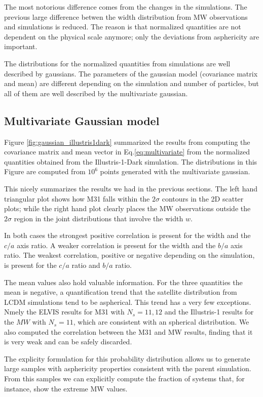 \documentclass[a4paper,fleqn,usenatbib]{mnras}
\begin{document}
The most notorious difference comes from the changes in the
simulations. 
The previous large difference betwen the width distribution from
MW observations and simulations is reduced. 
The reason is that normalized quantities are not dependent on the
physical scale anymore; only the deviations from asphericity are
important.

The distributions for the normalized quantities from simulations are
well described by gaussians. 
The parameters of the gaussian model (covariance matrix and mean)
are different depending on the simulation and number of particles, but
all of them are well described by the multivariate gaussian.

\subsection{Multivariate Gaussian model}

Figure \ref{fig:gaussian_illustris1dark} summarized the results from
 computing the covariance matrix and mean vector in
 Eq.\ref{eq:multivariate} from the normalized quantities obtained from
 the Illustris-1-Dark simulation.
The distributions in this Figure are computed from $10^6$ points
generated with the multivariate gaussian. 

This nicely summarizes the results we had in the previous
sections. 
The left hand triangular plot shows how M31 falls within the $2\sigma$
contours in the 2D scatter plots;
while the right hand plot clearly places the MW observations outside
the $2\sigma$ region in the joint distributions that involve the width
$w$.   

In both cases the strongest positive correlation is present for the
width and the $c/a$ axis ratio. 
A weaker correlation is present for the width and the $b/a$ axis
ratio.  
The weakest correlation, positive or negative depending on the
simulation, is present for the $c/a$ ratio and $b/a$ ratio.

The mean values also hold valuable information. 
For the three quantities the mean is negative, a quantification trend
that the satellite distribution from LCDM simulations tend to be aspherical.
This trend has a very few exceptions. 
Nmely the ELVIS results for M31 with $N_s=11,12$ and the Illustris-1
results for the $MW$ with $N_s=11$, which are consistent with an
spherical distribution. 
We also computed the correlation between the M31 and MW results,
finding that it is very weak and can be safely discarded. 

The explicity formulation for this probability distribution allows us
to generate large samples with asphericity properties consistent with
the parent simulation. 
From this samples we can explicitly compute the fraction of systems
that, for instance, show the extreme MW values.
\end{document}
